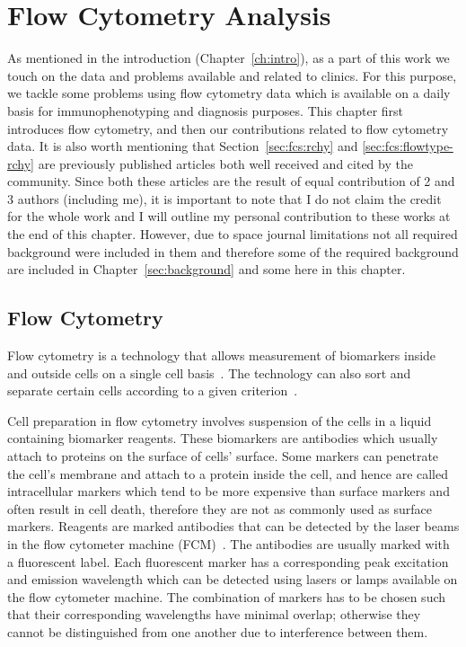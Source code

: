 \chapter{Flow Cytometry Analysis}
\label{sec:fcs}

As mentioned in the introduction (Chapter~\ref{ch:intro}), as a part of this work we touch on the data and problems available and related to clinics. For this purpose, we tackle some problems using flow cytometry data which is available on a daily basis for immunophenotyping and diagnosis purposes. This chapter first introduces flow cytometry, and then our contributions related to flow cytometry data. It is also worth mentioning that Section~\ref{sec:fcs:rchy} and \ref{sec:fcs:flowtype-rchy} are previously published articles both well received and cited by the community. Since both these articles are the result of equal contribution of 2 and 3 authors (including me), it is important to note that I do not claim the credit for the whole work and I will outline my personal contribution to these works at the end of this chapter. However, due to space journal limitations not all required background were included in them and therefore some of the required background are included in Chapter~\ref{sec:background} and some here in this chapter. 

\section{Flow Cytometry}
Flow cytometry is a technology that allows measurement of biomarkers inside and outside cells on a single cell basis~\cite{jaroszeski1999fundamentals}. The technology can also sort and separate certain cells according to a given criterion~\cite{flow-cytometry-sorting, jaroszeski1999fundamentals}.

Cell preparation in flow cytometry involves suspension of the cells in a liquid containing biomarker reagents. These biomarkers are antibodies which usually attach to proteins on the surface of cells' surface. Some markers can penetrate the cell's membrane and attach to a protein inside the cell, and hence are called intracellular markers which tend to be more expensive than surface markers and often result in cell death, therefore they are not as commonly used as surface markers. Reagents are marked antibodies that can be detected by the laser beams in the flow cytometer machine (FCM)~\cite{practical-flow-cytometry-book}. The antibodies are usually marked with a fluorescent label. Each fluorescent marker has a corresponding peak excitation and emission wavelength which can be detected using lasers or lamps available on the flow cytometer machine. The combination of markers has to be chosen such that their corresponding wavelengths have minimal overlap; otherwise they cannot be distinguished from one another due to interference between them.

